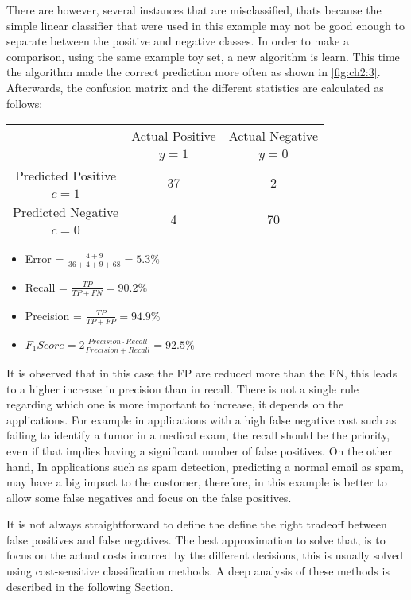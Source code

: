 There are however, several instances that are misclassified, thats because the simple linear 
classifier that were used in this example may not be good enough to separate between the positive 
and negative classes. In order to make a comparison, using the same example toy set, a new 
algorithm is learn. This time the algorithm made the correct prediction more often as shown in 
\figurename{ \ref{fig:ch2:3}}. Afterwards, the confusion matrix and the different statistics are 
calculated as follows:
\begin{center}
		\footnotesize
    \begin{tabular}{c|c|c}
			\multicolumn{1}{c|}{}  & Actual Positive& Actual Negative \\
			\multicolumn{1}{c|}{} & $y=1$& $y=0$ \\
			\hline
			Predicted Positive 		& \multirow{ 2}{*}{37} & \multirow{ 
			2}{*}{2} \\
			$c=1$ & &\\
			\hline
			Predicted Negative  	& \multirow{ 2}{*}{4} & \multirow{ 
			2}{*}{70} \\
			$c=0$ & &\\
		\end{tabular}
\end{center}
  \begin{itemize}
    \item Error = $\frac{4+9}{36+4+9+68}=5.3\%$
    \item Recall = $\frac{TP}{TP+FN}=90.2\%$
    \item Precision = $\frac{TP}{TP+FP}=94.9\%$
    \item $F_1Score = 2\frac{Precision \cdot Recall}{Precision + Recall}=92.5\%$
  \end{itemize}
It is observed that in this case the FP are reduced more than the FN, this leads to a higher 
increase in precision  than in recall. There is not a single rule regarding which one is more 
important to increase, it depends on the applications. For example in applications with a high 
false negative cost such as failing to identify a tumor in a medical exam, the recall should be the 
priority, even if that implies having a significant number of false positives. On the other hand, 
In applications such as spam detection, predicting a normal email as spam, may have a big impact to 
the customer, therefore, in this example is better to allow some false negatives and focus on the 
false positives.

It is not always straightforward  to define the define the right tradeoff between false positives 
and false negatives. The best approximation to solve that, is to focus on the actual costs incurred 
by the different decisions, this is usually solved using cost-sensitive classification methods. A 
deep analysis of these methods is described in the following Section.

